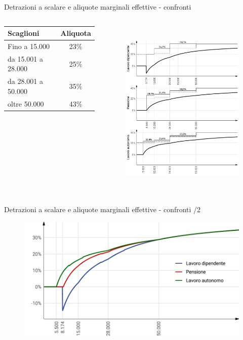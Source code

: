 \documentclass[aspectratio=64,12pt]{beamer}
\newcommand\€{\,\text{€}}
\begin{document}
\begin{frame}{Detrazioni a scalare e aliquote marginali effettive - confronti}
\begin{columns}
\begin{column}{.33\columnwidth}
\scriptsize
\begin{tabular}{lc}
  \toprule
  Scaglioni & Aliquota\\
  \midrule
  Fino a 15.000\€ &23\%\\
  da 15.001 a 28.000\€ &25\%\\
  da 28.001 a 50.000\€ &35\%\\
  oltre 50.000\€ &43\%\\
  \bottomrule                                                       
\end{tabular}
\end{column}

\begin{column}{.66\columnwidth}
\vspace*{-5mm}
\begin{figure}
\centering
\includegraphics[height=8.5cm]{./figure/aliquote-medie-marginali-2022.pdf}
\end{figure}
\end{column}
\end{columns}
\end{frame}


\begin{frame}{Detrazioni a scalare e aliquote marginali effettive - confronti /2}
\begin{figure}
\centering
\includegraphics[height=6cm]{./figure/aliquote-medie-2022-color.pdf}
\end{figure}
\end{frame}
\end{document}
